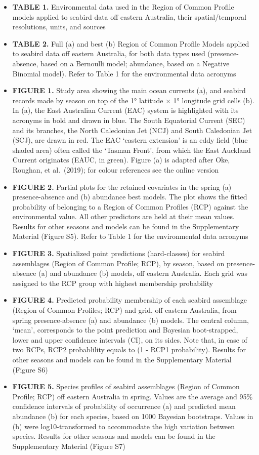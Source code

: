\documentclass{article}
\providecommand{\tightlist}{%
  \setlength{\itemsep}{0pt}\setlength{\parskip}{0pt}}
\begin{document}
\begin{itemize}
\tightlist
\item
  \textbf{TABLE 1.} Environmental data used in the Region of Common Profile models applied to seabird data off eastern Australia, their spatial/temporal resolutions, units, and sources
\item
  \textbf{TABLE 2.} Full (a) and best (b) Region of Common Profile Models applied to seabird data off eastern Australia, for both data types used (presence-absence, based on a Bernoulli model; abundance, based on a Negative Binomial model). Refer to Table 1 for the environmental data acronyms
\item
  \textbf{FIGURE 1.} Study area showing the main ocean currents (a), and seabird records made by season on top of the 1° latitude × 1° longitude grid cells (b). In (a), the East Australian Current (EAC) system is highlighted with its acronyms in bold and drawn in blue. The South Equatorial Current (SEC) and its branches, the North Caledonian Jet (NCJ) and South Caledonian Jet (SCJ), are drawn in red. The EAC `eastern extension' is an eddy field (blue shaded area) often called the `Tasman Front', from which the East Auckland Current originates (EAUC, in green). Figure (a) is adapted after Oke, Roughan, et al.~(2019); for colour references see the online version
\item
  \textbf{FIGURE 2.} Partial plots for the retained covariates in the spring (a) presence-absence and (b) abundance best models. The plot shows the fitted probability of belonging to a Region of Common Profiles (RCP) against the environmental value. All other predictors are held at their mean values. Results for other seasons and models can be found in the Supplementary Material (Figure S5). Refer to Table 1 for the environmental data acronyms
\item
  \textbf{FIGURE 3.} Spatialized point predictions (hard-classes) for seabird assemblages (Region of Common Profile; RCP), by season, based on presence-absence (a) and abundance (b) models, off eastern Australia. Each grid was assigned to the RCP group with highest membership probability
\item
  \textbf{FIGURE 4.} Predicted probability membership of each seabird assemblage (Region of Common Profiles; RCP) and grid, off eastern Australia, from spring presence-absence (a) and abundance (b) models. The central column, `mean', corresponds to the point prediction and Bayesian boot-strapped, lower and upper confidence intervals (CI), on its sides. Note that, in case of two RCPs, RCP2 probablility equals to (1 - RCP1 probability). Results for other seasons and models can be found in the Supplementary Material (Figure S6)
\item
  \textbf{FIGURE 5.} Species profiles of seabird assemblages (Region of Common Profile; RCP) off eastern Australia in spring. Values are the average and 95\% confidence intervals of probability of occurrence (a) and predicted mean abundance (b) for each species, based on 1000 Bayesian bootstraps. Values in (b) were log10-transformed to accommodate the high variation between species. Results for other seasons and models can be found in the Supplementary Material (Figure S7)
\end{itemize}
\end{document}
